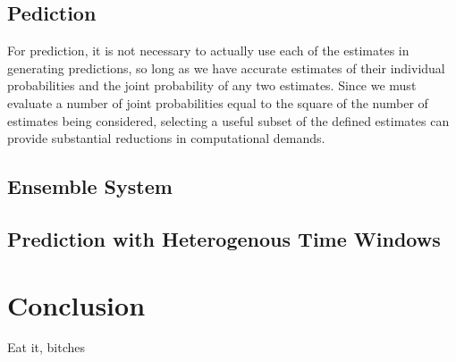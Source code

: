 \documentclass[10pt]{article}
\begin{document}
\subsection{Pediction}
For prediction, it is not necessary to actually use each of the estimates in generating predictions, so long as we have accurate estimates of their individual probabilities and the joint probability of any two estimates.  Since we must evaluate a number of joint probabilities equal to the square of the number of estimates being considered, selecting a useful subset of the defined estimates can provide substantial reductions in computational demands.


\subsection{Ensemble System}



\subsection{Prediction with Heterogenous Time Windows}



\section{Conclusion}
Eat it, bitches
\end{document}
